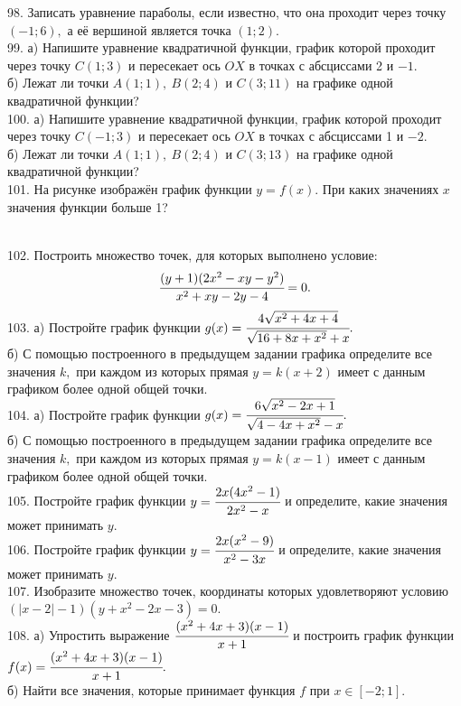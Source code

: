 98. Записать уравнение параболы, если известно, что она проходит через точку $(-1;6),$ а её вершиной является точка $(1;2).$\\
99. а) Напишите уравнение квадратичной функции, график которой проходит через точку $C(1;3)$ и пересекает ось $OX$ в точках с абсциссами 2 и $-1.$\\
б) Лежат ли точки $A(1;1),\ B(2;4)$ и $C(3;11)$ на графике одной квадратичной функции?\\
100. а) Напишите уравнение квадратичной функции, график которой проходит через точку $C(-1;3)$ и пересекает ось $OX$ в точках с абсциссами 1 и $-2.$\\
б) Лежат ли точки $A(1;1),\ B(2;4)$ и $C(3;13)$ на графике одной квадратичной функции?\\
101. На рисунке изображён график функции $y=f(x).$ При каких значениях $x$ значения функции больше 1?
\begin{figure}[ht!]
\end{figure}\\
102. Построить множество точек, для которых выполнено условие:
$$\cfrac{(y+1)(2x^2-xy-y^2)}{x^2+xy-2y-4}=0.$$
103. а) Постройте график функции $g(x)=\cfrac{4\sqrt{x^2+4x+4}}{\sqrt{16+8x+x^2}+x}.$\\
б) С помощью построенного в предыдущем задании графика определите все значения $k,$ при каждом из которых прямая $y=k(x+2)$ имеет с данным графиком более одной общей точки.\\
104. а) Постройте график функции $g(x)=\cfrac{6\sqrt{x^2-2x+1}}{\sqrt{4-4x+x^2}-x}.$\\
б) С помощью построенного в предыдущем задании графика определите все значения $k,$ при каждом из которых прямая $y=k(x-1)$ имеет с данным графиком более одной общей точки.\\
105. Постройте график функции $y=\cfrac{2x(4x^2-1)}{2x^2-x}$ и определите, какие значения может принимать $y.$\\
106. Постройте график функции $y=\cfrac{2x(x^2-9)}{x^2-3x}$ и определите, какие значения может принимать $y.$\\
107. Изобразите множество точек, координаты которых удовлетворяют условию $(|x-2|-1)(y+x^2-2x-3)=0.$\\
108. а) Упростить выражение $\cfrac{(x^2+4x+3)(x-1)}{x+1}$ и построить график функции \\$f(x)=\cfrac{(x^2+4x+3)(x-1)}{x+1}.$\\
б) Найти все значения, которые принимает функция $f$ при $x\in[-2;1].$\\
